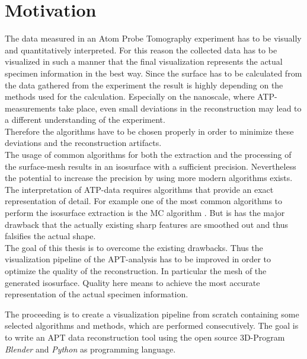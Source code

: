 \chapter{Motivation}
\label{motivation}

The data measured in an Atom Probe Tomography experiment has to be visually and quantitatively interpreted.
For this reason the collected data has to be visualized in such a manner that 
the final visualization represents the actual specimen information in the best way.
Since the surface has to be calculated from the data gathered from the experiment the result is highly depending on the  methods used for the calculation. Especially on the nanoscale, where ATP-measurements take place, even small deviations in the reconstruction may lead to a different understanding of the experiment.\\

Therefore the algorithms have to be chosen properly in order to minimize these deviations and the reconstruction artifacts.\\

The usage of common algorithms for both the extraction and the processing of the surface-mesh results in an isosurface with a sufficient precision. Nevertheless the potential to increase the precision by using more modern algorithms exists.
The interpretation of ATP-data requires algorithms that provide an exact representation of detail.
For example one of the most common algorithms to perform the isosurface extraction is the \ac{MC} algorithm \cite{Lor87}. But is has the major drawback that the actually existing sharp features are smoothed out and thus falsifies the actual shape.\\

The goal of this thesis is to overcome the existing drawbacks. Thus the visualization pipeline of the \ac{APT}-analysis has to be improved in order to optimize the quality of the reconstruction. In particular the mesh of the generated isosurface.
Quality here means to achieve the most accurate representation of the actual specimen information.

The proceeding is to create a visualization pipeline from scratch containing some selected algorithms and methods, which are performed consecutively. The goal is to write an \ac{APT} data reconstruction tool using the open source 3D-Program \emph{Blender} and \emph{Python} as programming language.
